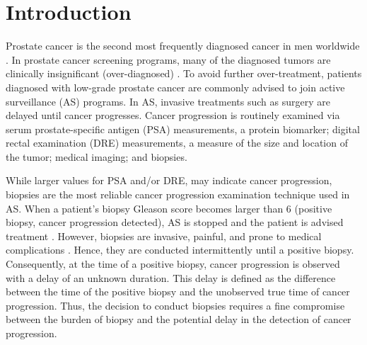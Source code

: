 
\section{Introduction}
\label{sec:introduction}
Prostate cancer is the second most frequently diagnosed cancer in men worldwide \cite{GlobalCancerStats2012}. In prostate cancer screening programs, many of the diagnosed tumors are clinically insignificant (over-diagnosed) \cite{etzioni2002overdiagnosis}. To avoid further over-treatment, patients diagnosed with low-grade prostate cancer are commonly advised to join active surveillance (AS) programs. In AS, invasive treatments such as surgery are delayed until cancer progresses. Cancer progression is routinely examined via serum prostate-specific antigen (PSA) measurements, a protein biomarker; digital rectal examination (DRE) measurements, a measure of the size and location of the tumor; medical imaging; and biopsies.

While larger values for PSA and/or DRE, may indicate cancer progression, biopsies are the most reliable cancer progression examination technique used in AS. When a patient's biopsy Gleason score becomes larger than 6 (positive biopsy, cancer progression detected), AS is stopped and the patient is advised treatment \cite{bokhorst2015compliance}. However, biopsies are invasive, painful, and prone to medical complications \cite{ehdaie2014impact,fujita2009serial}. Hence, they are conducted intermittently until a positive biopsy. Consequently, at the time of a positive biopsy, cancer progression is observed with a delay of an unknown duration. This delay is defined as the difference between the time of the positive biopsy and the unobserved true time of cancer progression. Thus, the decision to conduct biopsies requires a fine compromise between the burden of biopsy and the potential delay in the detection of cancer progression.

